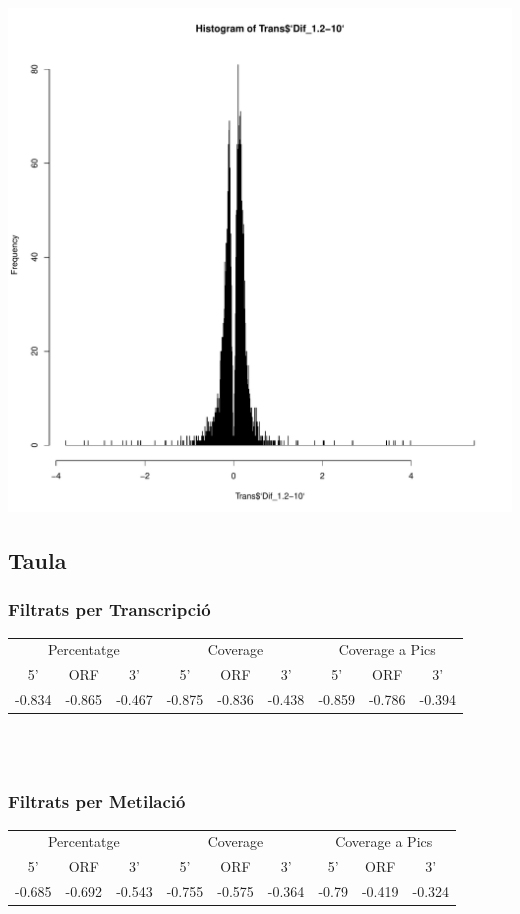\documentclass{article}\usepackage[]{graphicx}\usepackage[]{color}
\newenvironment{knitrout}{}{} %
\begin{document}
\begin{knitrout}
{\includegraphics[width=.9\linewidth]{figure/minimal-cor_graf-3} 

}



\end{knitrout}
\clearpage



\subsection{Taula}
\subsubsection{Filtrats per Transcripció}
\begin{tabular}{ccc|ccc|ccc}
\hline
\multicolumn{3}{c}{Percentatge} &
\multicolumn{3}{c}{Coverage} &
\multicolumn{3}{c}{Coverage a Pics} \\
\cline{1-3}
\cline{4-6}
\cline{7-9}
5' & ORF & 3' & 5' & ORF & 3' & 5' & ORF & 3' \\
\hline
-0.834 & -0.865 & -0.467 &
-0.875 & -0.836 & -0.438 &
-0.859 & -0.786 & -0.394\\
\hline
\end{tabular} \\\\

\subsubsection{Filtrats per Metilació}
\begin{tabular}{ccc|ccc|ccc}
\hline
\multicolumn{3}{c}{Percentatge} &
\multicolumn{3}{c}{Coverage} &
\multicolumn{3}{c}{Coverage a Pics} \\
\cline{1-3}
\cline{4-6}
\cline{7-9}
5' & ORF & 3' & 5' & ORF & 3' & 5' & ORF & 3' \\
\hline
-0.685 & -0.692 & -0.543 &
-0.755 & -0.575 & -0.364 &
-0.79 & -0.419 & -0.324\\
\hline
\end{tabular} \\\\
\end{document}
